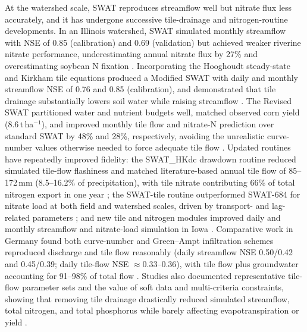 At the watershed scale, SWAT reproduces streamflow well but nitrate flux less accurately, and it has undergone successive tile-drainage and nitrogen-routine developments. In an Illinois watershed, SWAT simulated monthly streamflow with NSE of 0.85 (calibration) and 0.69 (validation) but achieved weaker riverine nitrate performance, underestimating annual nitrate flux by 27\% and overestimating soybean N fixation \parencite{Hu2007}. Incorporating the Hooghoudt steady-state and Kirkham tile equations produced a Modified SWAT with daily and monthly streamflow NSE of 0.76 and 0.85 (calibration), and demonstrated that tile drainage substantially lowers soil water while raising streamflow \parencite{Moriasi2012}. The Revised SWAT partitioned water and nutrient budgets well, matched observed corn yield (8.6\,t\,ha$^{-1}$), and improved monthly tile flow and nitrate-N prediction over standard SWAT by 48\% and 28\%, respectively, avoiding the unrealistic curve-number values otherwise needed to force adequate tile flow \parencite{Moriasi2013,Moriasi2013b}. Updated routines have repeatedly improved fidelity: the SWAT\_HKdc drawdown routine reduced simulated tile-flow flashiness and matched literature-based annual tile flow of 85--172\,mm (8.5--16.2\% of precipitation), with tile nitrate contributing 66\% of total nitrogen export in one year \parencite{Boles2015}; the SWAT-tile routine outperformed SWAT-684 for nitrate load at both field and watershed scales, driven by transport- and lag-related parameters \parencite{Kim2023}; and new tile and nitrogen modules improved daily and monthly streamflow and nitrate-load simulation in Iowa \parencite{Qi2025}. Comparative work in Germany found both curve-number and Green--Ampt infiltration schemes reproduced discharge and tile flow reasonably (daily streamflow NSE 0.50/0.42 and 0.45/0.39; daily tile-flow NSE $\approx$0.33--0.36), with tile flow plus groundwater accounting for 91--98\% of total flow \parencite{Bauwe2016}. Studies also documented representative tile-flow parameter sets \parencite{Guo2018b,Brighenti2023} and the value of soft data and multi-criteria constraints, showing that removing tile drainage drastically reduced simulated streamflow, total nitrogen, and total phosphorus while barely affecting evapotranspiration or yield \parencite{Nelson2018}.

